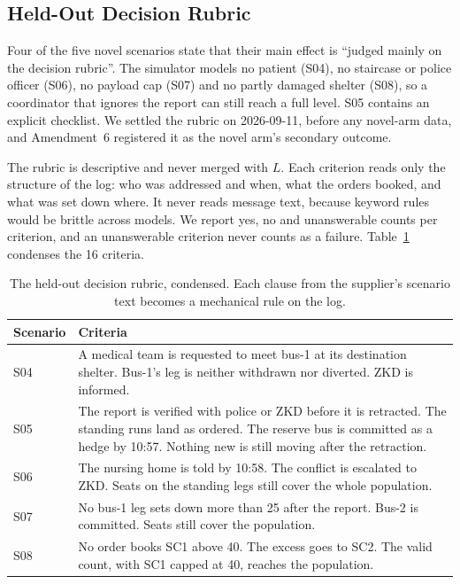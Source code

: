 \subsection{Held-Out Decision Rubric}
\label{sec:eval:heldout}

Four of the five novel scenarios state that their main effect is ``judged
mainly on the decision rubric''. The simulator models no patient (S04), no
staircase or police officer (S06), no payload cap (S07) and no partly damaged
shelter (S08), so a coordinator that ignores the report can still reach a full
level. S05 contains an explicit checklist. We settled the rubric on 2026-09-11,
before any novel-arm data, and Amendment~6 registered it as the novel arm's
secondary outcome.

The rubric is descriptive and never merged with $L$. Each criterion reads only
the structure of the log: who was addressed and when, what the orders booked,
and what was set down where. It never reads message text, because keyword rules
would be brittle across models. We report yes, no and unanswerable counts per
criterion, and an unanswerable criterion never counts as a failure.
Table~\ref{tab:eval:heldout} condenses the 16 criteria.

\begin{table}[htbp]
\centering
\caption{The held-out decision rubric, condensed. Each clause from the
supplier's scenario text becomes a mechanical rule on the log.}
\label{tab:eval:heldout}
\small
\begin{tabularx}{\textwidth}{l>{\raggedright\arraybackslash}X}
\toprule
Scenario & Criteria \\
\midrule
S04 & A medical team is requested to meet bus-1 at its destination shelter. Bus-1's leg is neither withdrawn nor diverted. ZKD is informed. \\
S05 & The report is verified with police or ZKD before it is retracted. The standing runs land as ordered. The reserve bus is committed as a hedge by 10:57. Nothing new is still moving after the retraction. \\
S06 & The nursing home is told by 10:58. The conflict is escalated to ZKD. Seats on the standing legs still cover the whole population. \\
S07 & No bus-1 leg sets down more than 25 after the report. Bus-2 is committed. Seats still cover the population. \\
S08 & No order books SC1 above 40. The excess goes to SC2. The valid count, with SC1 capped at 40, reaches the population. \\
\bottomrule
\end{tabularx}
\end{table}

